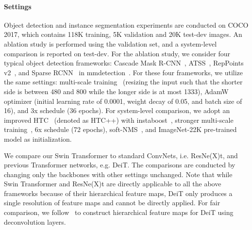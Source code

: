 \documentclass[10pt,twocolumn,letterpaper]{article}
\begin{document}
\paragraph{Settings} Object detection and instance segmentation experiments are conducted on COCO 2017, which contains 118K training, 5K validation and 20K test-dev images. An ablation study is performed using the validation set, and a system-level comparison is reported on test-dev. For the ablation study, we consider four typical object detection frameworks: 
Cascade Mask R-CNN~\cite{he2017mask,cai2018cascade}, ATSS~\cite{zhang2020bridging}, RepPoints v2~\cite{chen2020reppointsv2}, and Sparse RCNN~\cite{sun2020sparsercnn} in mmdetection~\cite{chen2019mmdetection}. For these four frameworks, we utilize the same settings: multi-scale training~\cite{carion2020detr,sun2020sparsercnn} (resizing the input such that the shorter side is between 480 and 800 while the longer side is at most 1333), AdamW~\cite{loshchilov2017decoupled} optimizer (initial learning rate of 0.0001, weight decay of 0.05, and batch size of 16), and 3x schedule (36 epochs).
For system-level comparison, we adopt an improved HTC~\cite{chen2019htc} (denoted as HTC++) with instaboost~\cite{fang2019instaboost}, stronger multi-scale training~\cite{cao2019gcnet}, 6x schedule (72 epochs), soft-NMS~\cite{Bodla2017softnms}, and ImageNet-22K pre-trained model as initialization.

We compare our Swin Transformer to standard ConvNets, i.e. ResNe(X)t, and previous Transformer networks, e.g. DeiT. The comparisons are conducted by changing only the backbones with other settings unchanged. Note that while Swin Transformer and ResNe(X)t are directly applicable to all the above frameworks because of their hierarchical feature maps, DeiT only produces a single resolution of feature maps and cannot be directly applied. For fair comparison, we follow~\cite{zheng2020SETR} to construct hierarchical feature maps for DeiT using deconvolution layers. 
\end{document}
